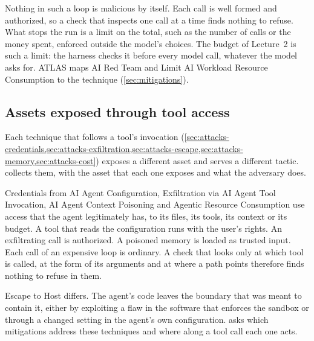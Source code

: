 Nothing in such a loop is malicious by itself. Each call is well formed and authorized, so a check
that inspects one call at a time finds nothing to refuse. What stops the run is a limit on the
total, such as the number of calls or the money spent, enforced outside the model's choices. The
budget of Lecture~2 is such a limit: the harness checks it before every model call, whatever the
model asks for. ATLAS maps AI Red Team and Limit AI Workload Resource Consumption to the technique
(\cref{sec:mitigations}).

\subsection{Assets exposed through tool access}
\label{sec:attacks-summary}

Each technique that follows a tool's invocation
(\cref{sec:attacks-credentials,sec:attacks-exfiltration,sec:attacks-escape,sec:attacks-memory,sec:attacks-cost})
exposes a different asset and serves a different tactic.  collects them,
with the asset that each one exposes and what the adversary does.

Credentials from AI Agent Configuration, Exfiltration via AI Agent Tool Invocation, AI Agent Context
Poisoning and Agentic Resource Consumption use access that the agent legitimately has, to its
files, its tools, its context or its budget. A tool that reads the configuration runs with the
user's rights. An exfiltrating call is authorized. A poisoned memory is loaded as trusted input.
Each call of an expensive loop is ordinary. A check that looks only at which tool is called, at the
form of its arguments and at where a path points therefore finds nothing to refuse in them.

Escape to Host differs. The agent's code leaves the boundary that was meant to contain it, either by
exploiting a flaw in the software that enforces the sandbox or through a changed setting in the
agent's own configuration.  asks which mitigations address these techniques
and where along a tool call each one acts.

